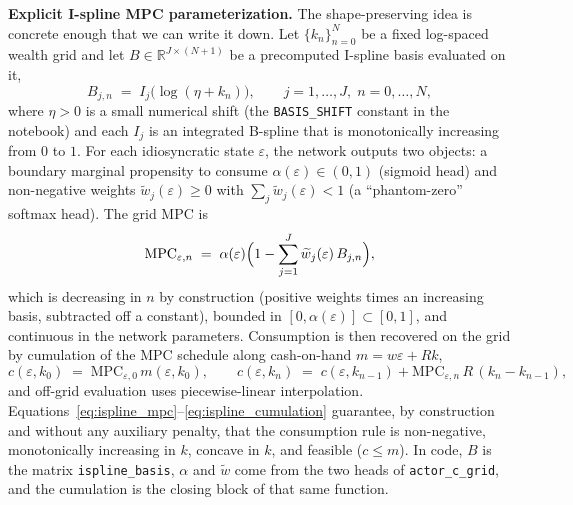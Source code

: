\documentclass[11pt,a4paper]{report}
\begin{document}
\medskip\noindent\textbf{Explicit I-spline MPC parameterization.}
The shape-preserving idea is concrete enough that we can write it down.  Let $\{k_n\}_{n=0}^N$ be a fixed log-spaced wealth grid and let $B \in \mathbb{R}^{J \times (N+1)}$ be a precomputed I-spline basis evaluated on it,
\[
B_{j,n} \;=\; I_j\!\bigl(\log(\eta + k_n)\bigr), \qquad j = 1,\ldots,J,\; n=0,\ldots,N,
\]
where $\eta>0$ is a small numerical shift (the \texttt{BASIS\_SHIFT} constant in the notebook) and each $I_j$ is an integrated B-spline that is monotonically increasing from $0$ to $1$.  For each idiosyncratic state $\varepsilon$, the network outputs two objects: a boundary marginal propensity to consume $\alpha(\varepsilon)\in(0,1)$ (sigmoid head) and non-negative weights $\widetilde w_j(\varepsilon)\ge 0$ with $\sum_j \widetilde w_j(\varepsilon) < 1$ (a ``phantom-zero'' softmax head).  The grid MPC is
\begin{equation}
\mathrm{MPC}_{\varepsilon,n} \;=\; \alpha(\varepsilon)\Bigl(1 - \sum_{j=1}^J \widetilde w_j(\varepsilon)\, B_{j,n}\Bigr),
\label{eq:ispline_mpc}
\end{equation}
which is decreasing in $n$ by construction (positive weights times an increasing basis, subtracted off a constant), bounded in $[0, \alpha(\varepsilon)] \subset [0,1]$, and continuous in the network parameters.  Consumption is then recovered on the grid by cumulation of the MPC schedule along cash-on-hand $m = w\varepsilon + Rk$,
\begin{equation}
c(\varepsilon, k_0) \;=\; \mathrm{MPC}_{\varepsilon,0}\, m(\varepsilon, k_0), \qquad
c(\varepsilon, k_n) \;=\; c(\varepsilon, k_{n-1}) + \mathrm{MPC}_{\varepsilon,n}\, R\, (k_n - k_{n-1}),
\label{eq:ispline_cumulation}
\end{equation}
and off-grid evaluation uses piecewise-linear interpolation.  Equations~\eqref{eq:ispline_mpc}--\eqref{eq:ispline_cumulation} guarantee, by construction and without any auxiliary penalty, that the consumption rule is non-negative, monotonically increasing in $k$, concave in $k$, and feasible ($c \le m$).  In code, $B$ is the matrix \texttt{ispline\_basis}, $\alpha$ and $\widetilde w$ come from the two heads of \texttt{actor\_c\_grid}, and the cumulation is the closing block of that same function.
\end{document}
